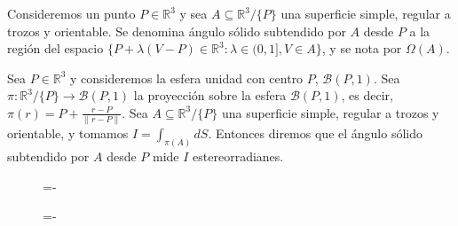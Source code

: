 \begin{definicion}
  Consideremos un punto $P \in \mathds{R}^3$ y sea $A \subseteq \mathds{R}^3/\{P\}$ una superficie simple, regular a trozos y orientable. Se denomina ángulo sólido subtendido por $A$ desde $P$ a la región del espacio $\{P + \lambda (V-P) \in \mathds{R}^3 : \lambda \in (0,1], V \in A\}$, y se nota por $\Omega(A)$. 
\end{definicion}

\begin{definicion}
    Sea $P \in \mathds{R}^3$ y consideremos la esfera unidad con centro $P$, $\mathcal{B}(P,1)$. Sea $\pi :\mathds{R}^3/\{P\}\rightarrow \mathcal{B}(P,1)$ la proyección sobre la esfera $\mathcal{B}(P,1)$, es decir, $\pi(r) = P + \frac{r-P}{\|r-P\|}$. Sea $A \subseteq \mathds{R}^3/\{P\}$ una superficie simple, regular a trozos y orientable, y tomamos $I = \int _{\pi(A)} dS$. Entonces diremos que el ángulo sólido subtendido por $A$ desde $P$ mide $I$ estereorradianes.
\end{definicion}

\begin{figure}[h]
  \lineskip=-\fboxrule
\end{figure}

\begin{figure}[h]
  \lineskip=-\fboxrule
\end{figure}


